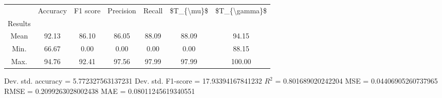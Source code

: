 \begin{tabular}{|c|c|c|c|c|c|c|}
\toprule
{} &  Accuracy &  F1 score &  Precision &  Recall &  \$T\_\{\textbackslash mu\}\$ &  \$T\_\{\textbackslash gamma\}\$ \\
Results &           &           &            &         &            &               \\
\hline
Mean    &     92.13 &     86.10 &      86.05 &   88.09 &      88.09 &         94.15 \\
Min.    &     66.67 &      0.00 &       0.00 &    0.00 &       0.00 &         88.15 \\
Max.    &     94.76 &     92.41 &      97.56 &   97.99 &      97.99 &        100.00 \\
\bottomrule
\end{tabular}

 Dev. std. accuracy = 5.772327563137231
 Dev. std. F1-score = 17.93394167841232
 $R^2$ = 0.801689020242204
 MSE = 0.04406905260737965
 RMSE = 0.2099263028002438
 MAE = 0.08011245619340551